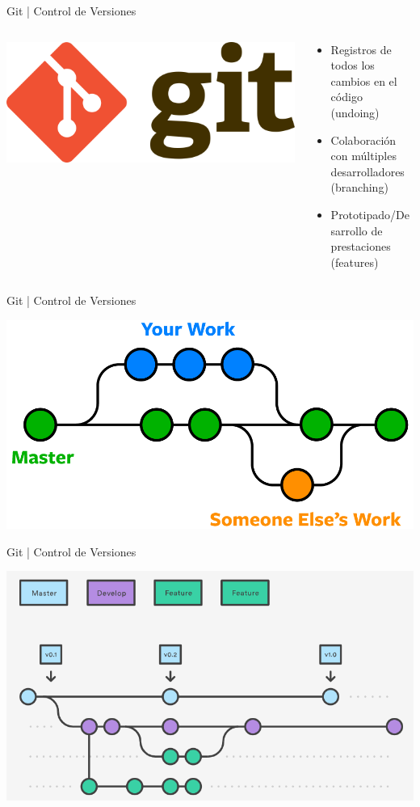 \documentclass{beamer}
\begin{document}
\begin{frame}{Git | Control de Versiones}
	\begin{columns}
		\begin{column}{.3\textwidth}
			\includegraphics[scale=.1]{img/git_logo.png}
		\end{column}
		\begin{column}{.6\textwidth}
			
			\begin{itemize}
				\item Registros de todos los cambios en el código (undoing)
				\item Colaboración con múltiples desarrolladores (branching)
				\item Prototipado/Desarrollo de prestaciones (features)
			\end{itemize}
		\end{column}
	\end{columns}
\end{frame}

\begin{frame}{Git | Control de Versiones}

	\includegraphics[scale=.3]{img/branches.png}
	
\end{frame}

\begin{frame}{Git | Control de Versiones}
	
	\includegraphics[scale=.35]{img/git_project.png}
	
\end{frame}
\end{document}
